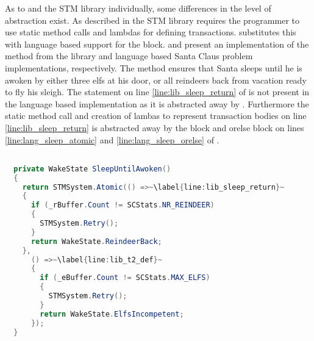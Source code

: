 As to \stmname and the \ac{STM} library individually, some differences in the level of abstraction exist. As described in  the \ac{STM} library requires the programmer to use static method calls and lambdas for defining transactions. \stmname substitutes this with language based support for the  block.  and  present an implementation of the  method from the library and language based Santa Claus problem implementations, respectively. The method ensures that Santa sleeps until he is awoken by either three elfs at his door, or all reindeers back from vacation ready to fly his sleigh. The  statement on line \ref{line:lib_sleep_return} of  is not present in the language based implementation as it is abstracted away by \stmnamesp. Furthermore the static method call and creation of lambas to represent transaction bodies on line \ref{line:lib_sleep_return} is abstracted away by the  block and orelse block on lines \ref{line:lang_sleep_atomic} and \ref{line:lang_sleep_orelse} of .

\begin{lstlisting}[float,label=lst:lib_SleepUntilAwoken,
  caption={\bscode{SleepUntilAwoken} Method - \ac{STM} Library},
  language=Java,  
  showspaces=false,
  showtabs=false,
  breaklines=true,
  showstringspaces=false,
  breakatwhitespace=true,
  escapechar=~,
  commentstyle=\color{greencomments},
  keywordstyle=\color{bluekeywords},
  stringstyle=\color{redstrings},
  morekeywords={atomic, retry, orelse, var, get, set, ref, out}]  % Start your code-block

  private WakeState SleepUntilAwoken()
  {
    return STMSystem.Atomic(() =>~\label{line:lib_sleep_return}~
    {
      if (_rBuffer.Count != SCStats.NR_REINDEER)
      {
        STMSystem.Retry();
      }
      return WakeState.ReindeerBack;
    },
      () =>~\label{line:lib_t2_def}~
      {
        if (_eBuffer.Count != SCStats.MAX_ELFS)
        {
          STMSystem.Retry();
        }
        return WakeState.ElfsIncompetent;
      });
  }
\end{lstlisting}

